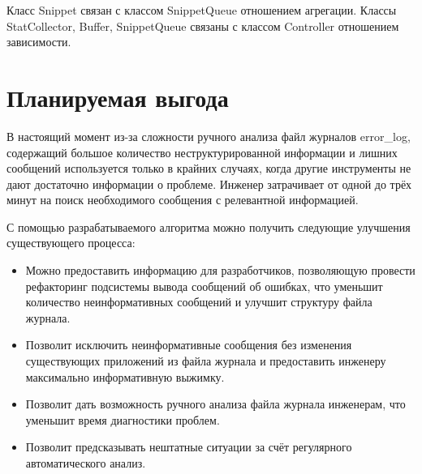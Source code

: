 Класс Snippet связан с классом SnippetQueue отношением агрегации.
Классы StatCollector, Buffer, SnippetQueue связаны с классом Controller
отношением зависимости.

\section{Планируемая выгода}

В настоящий момент из-за сложности ручного анализа файл журналов error\_log,
содержащий большое количество неструктурированной информации и
лишних сообщений используется только в крайних случаях, когда другие
инструменты не дают достаточно информации о проблеме. Инженер затрачивает
от одной до трёх минут на поиск необходимого сообщения с релевантной
информацией.

С помощью разрабатываемого алгоритма можно получить следующие улучшения
существующего процесса:

\begin{itemize}
  \item Можно предоставить информацию для разработчиков, позволяющую провести
    рефакторинг подсистемы вывода сообщений об ошибках, что уменьшит
    количество неинформативных сообщений и улучшит структуру файла журнала.
  \item Позволит исключить неинформативные сообщения без изменения существующих
    приложений из файла журнала и предоставить инженеру максимально
    информативную выжимку.
  \item Позволит дать возможность ручного анализа файла журнала инженерам,
    что уменьшит время диагностики проблем.
  \item Позволит предсказывать нештатные ситуации за счёт регулярного
    автоматического анализ.
\end{itemize}
